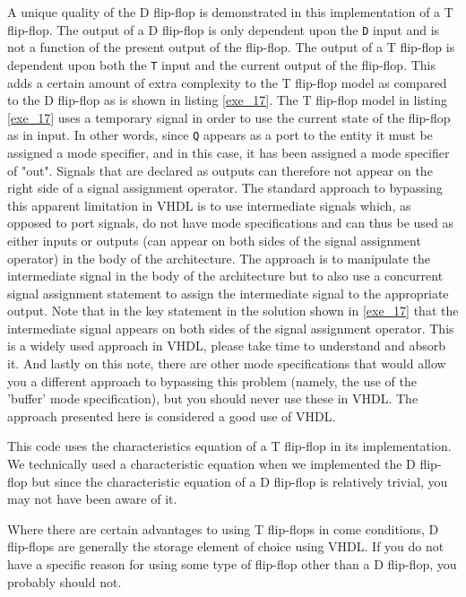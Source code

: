 \begin{my_list}
\item A unique quality of the D flip-flop is demonstrated in this implementation of a T flip-flop. The output of a D flip-flop is only dependent upon the \texttt{D} input and is not a function of the present output of the flip-flop. The output of a T flip-flop is dependent upon both the \texttt{T} input and the current output of the flip-flop. This adds a certain amount of extra complexity to the T flip-flop model as compared to the D flip-flop as is shown in listing \ref{exe_17}. The T flip-flop model in listing \ref{exe_17} uses a temporary signal in order to use the current state of the flip-flop as in input. In other words, since \texttt{Q} appears as a port to the entity it must be assigned a mode specifier, and in this case, it has been assigned a mode specifier of "out". Signals that are declared as outputs can therefore not appear on the right side of a signal assignment operator. The standard approach to bypassing this apparent limitation in VHDL is to use intermediate signals which, as opposed to port signals, do not have mode specifications and can thus be used as either inputs or outputs (can appear on both sides of the signal assignment operator) in the body of the architecture. The approach is to manipulate the intermediate signal in the body of the architecture but to also use a concurrent signal assignment statement to assign the intermediate signal to the appropriate output. Note that in the key statement in the solution shown in \ref{exe_17} that the intermediate signal appears on both sides of the signal assignment operator. This is a widely used approach in VHDL, please take time to understand and absorb it. And lastly on this note, there are other mode specifications that would allow you a different approach to bypassing this problem (namely, the use of the 'buffer' mode specification), but you should never use these in VHDL. The approach presented here is considered a good use of VHDL. 

\item This code uses the characteristics equation of a T flip-flop in its implementation. We technically used a characteristic equation when we implemented the D flip-flop but since the characteristic equation of a D flip-flop is relatively trivial, you may not have been aware of it.
\item Where there are certain advantages to using T flip-flops in come conditions, D flip-flops are generally the storage element of choice using VHDL. If you do not have a specific reason for using some type of flip-flop other than a D flip-flop, you probably should not. 
\end{my_list}

